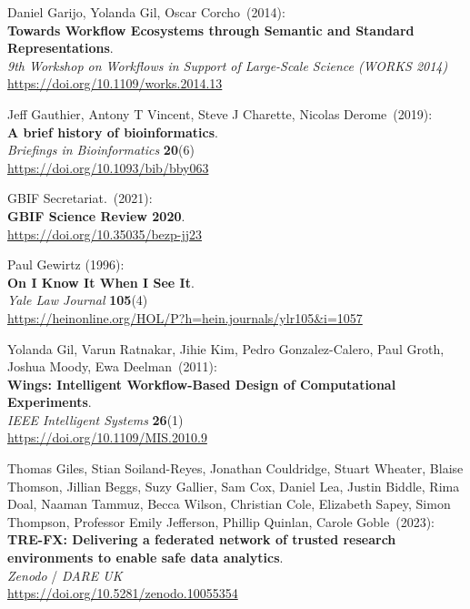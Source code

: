 \begin{thebibliography}{9}
Daniel Garijo, Yolanda Gil, Oscar Corcho~(2014): \\
\textbf{Towards Workflow Ecosystems through Semantic and Standard Representations}.\\
\emph{9th Workshop on Workflows in Support of Large-Scale Science (WORKS 2014)}\\
\url{https://doi.org/10.1109/works.2014.13} 

Jeff Gauthier, Antony T Vincent, Steve J Charette, Nicolas Derome~(2019): \\
\textbf{A brief history of bioinformatics}.\\
\emph{Briefings in Bioinformatics} \textbf{20}(6)\\
\url{https://doi.org/10.1093/bib/bby063}

GBIF Secretariat.~(2021): \\
\textbf{GBIF Science Review 2020}.\\
\url{https://doi.org/10.35035/bezp-jj23}

Paul Gewirtz (1996):\\
\textbf{On I Know It When I See It}.\\
\emph{Yale Law Journal} \textbf{105}(4)\\
\url{https://heinonline.org/HOL/P?h=hein.journals/ylr105&i=1057}

Yolanda Gil, Varun Ratnakar, Jihie Kim, Pedro Gonzalez-Calero, Paul Groth, Joshua Moody, Ewa Deelman~(2011): \\
\textbf{Wings: Intelligent Workflow-Based Design of Computational Experiments}.\\
\emph{IEEE Intelligent Systems} \textbf{26}(1) \\
\url{https://doi.org/10.1109/MIS.2010.9}

Thomas Giles, Stian Soiland-Reyes, Jonathan Couldridge, Stuart Wheater, Blaise Thomson, Jillian Beggs, Suzy Gallier, Sam Cox, Daniel Lea, Justin Biddle, Rima Doal, Naaman Tammuz, Becca Wilson, Christian Cole, Elizabeth Sapey, Simon Thompson, Professor Emily Jefferson, Phillip Quinlan, Carole Goble~(2023): \\
\textbf{TRE-FX: Delivering a federated network of trusted research environments to enable safe data analytics}.\\
\emph{Zenodo} / \emph{DARE UK} \\
\url{https://doi.org/10.5281/zenodo.10055354}


\end{thebibliography}
